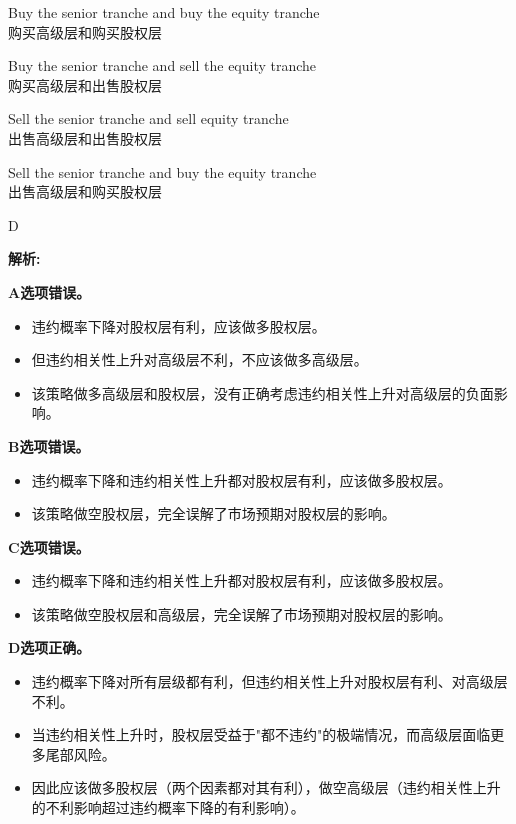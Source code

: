 \documentclass{article}
\newenvironment{explanation}
{\textbf{解析:}\par}
{\par}
\begin{document}
\begin{choices}
    \item Buy the senior tranche and buy the equity tranche\\
    购买高级层和购买股权层
    \item Buy the senior tranche and sell the equity tranche\\
    购买高级层和出售股权层
    \item Sell the senior tranche and sell equity tranche\\
    出售高级层和出售股权层
    \item Sell the senior tranche and buy the equity tranche\\
    出售高级层和购买股权层
\end{choices}

\begin{correctanswer}
    D
\end{correctanswer}

\begin{explanation}
    \textbf{A选项错误。}
    \begin{itemize}
        \item 违约概率下降对股权层有利，应该做多股权层。
        \item 但违约相关性上升对高级层不利，不应该做多高级层。
        \item 该策略做多高级层和股权层，没有正确考虑违约相关性上升对高级层的负面影响。
    \end{itemize}

    \textbf{B选项错误。}
    \begin{itemize}
        \item 违约概率下降和违约相关性上升都对股权层有利，应该做多股权层。
        \item 该策略做空股权层，完全误解了市场预期对股权层的影响。
    \end{itemize}

    \textbf{C选项错误。}
    \begin{itemize}
        \item 违约概率下降和违约相关性上升都对股权层有利，应该做多股权层。
        \item 该策略做空股权层和高级层，完全误解了市场预期对股权层的影响。
    \end{itemize}

    \textbf{D选项正确。}
    \begin{itemize}
        \item 违约概率下降对所有层级都有利，但违约相关性上升对股权层有利、对高级层不利。
        \item 当违约相关性上升时，股权层受益于"都不违约"的极端情况，而高级层面临更多尾部风险。
        \item 因此应该做多股权层（两个因素都对其有利），做空高级层（违约相关性上升的不利影响超过违约概率下降的有利影响）。  
    \end{itemize}
\end{explanation}
\end{document}
